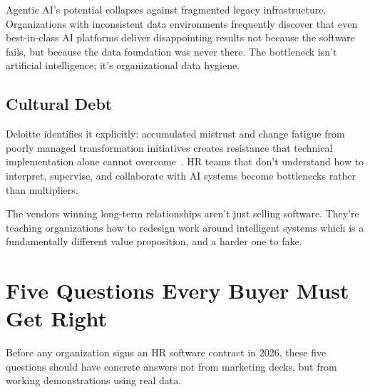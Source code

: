 \documentclass[12pt, a4paper]{article}
\begin{document}
Agentic AI's potential collapses against fragmented legacy infrastructure. Organizations
with inconsistent data environments frequently discover that even best-in-class AI
platforms deliver disappointing results not because the software fails, but because
the data foundation was never there. The bottleneck isn't artificial intelligence; it's
organizational data hygiene.

\subsection*{Cultural Debt}

Deloitte identifies it explicitly: accumulated mistrust and change fatigue from poorly
managed transformation initiatives creates resistance that technical implementation alone
cannot overcome~\cite{deloitte2026}. HR teams that don't understand how to interpret,
supervise, and collaborate with AI systems become bottlenecks rather than multipliers.

The vendors winning long-term relationships aren't just selling software. They're teaching
organizations how to redesign work around intelligent systems which is a fundamentally
different value proposition, and a harder one to fake.

\section{Five Questions Every Buyer Must Get Right}

Before any organization signs an HR software contract in 2026, these five questions
should have concrete answers not from marketing decks, but from working demonstrations
using real data.
\end{document}
